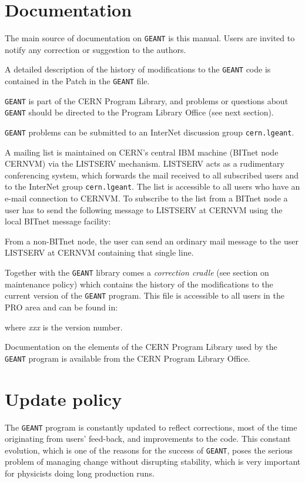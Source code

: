  
\section{Documentation}
 
The main source of documentation on {\tt GEANT} is this manual. Users are
invited to notify any correction or suggestion to the authors.
 
A detailed description of the history of modifications to the {\tt GEANT} code
is contained in the  Patch in the {\tt GEANT} file.
 
{\tt GEANT} is part of the CERN Program Library, and problems or questions
about {\tt GEANT} should be directed to the Program Library Office (see next
section).
 
{\tt GEANT} problems can be submitted to
an InterNet discussion group {\tt cern.lgeant}.

A mailing list is maintained on CERN's central IBM machine (BITnet node
CERNVM) via the LISTSERV mechanism. LISTSERV acts as a rudimentary
conferencing system, which forwards the mail received to all subscribed
users and to the InterNet group {\tt cern.lgeant}. 
The list is accessible to all users who have an e-mail connection
to CERNVM. To subscribe to the list from a BITnet node a user has to
send the following message to LISTSERV at CERNVM using the local
BITnet message facility:

\begin{center}
\end{center}

From a non-BITnet node, the user can send an ordinary mail message to
the user LISTSERV at CERNVM containing that single line.
 
Together with the {\tt GEANT} library comes a 
{\it correction cradle} (see section on
maintenance policy) which contains the history of the
modifications to the current
version of the {\tt GEANT} program. This file is accessible to all
users in the PRO area and can be found in:

\begin{center}
\end{center}

where {\it xxx} is the version number.
 
Documentation on the elements of the CERN Program Library used by the {\tt GEANT}
program is available from the CERN Program Library Office.

\section{Update policy}
The {\tt GEANT} program is constantly updated to reflect corrections, most
of the time originating from users' feed-back, and improvements to
the code. This constant evolution, which is one of the reasons for the 
success of {\tt GEANT},
poses the serious problem of managing change without disrupting stability,
which is very important for physicists doing long production runs.
 
